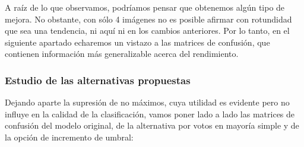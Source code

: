 \documentclass[11pt,a4paper]{article}
\begin{document}
                \par
                A raíz de lo que observamos, podríamos pensar que obtenemos algún tipo de mejora. No obstante, con sólo 4 imágenes no es posible afirmar con rotundidad que sea una tendencia, ni aquí ni en los cambios anteriores. Por lo tanto, en el siguiente apartado echaremos un vistazo a las matrices de confusión, que contienen información más generalizable acerca del rendimiento.

            \subsubsection{Estudio de las alternativas propuestas}

                \par
                Dejando aparte la supresión de no máximos, cuya utilidad es evidente pero no influye en la calidad de la clasificación, vamos poner lado a lado las matrices de confusión del modelo original, de la alternativa por votos en mayoría simple y de la opción de incremento de umbral:
\end{document}
